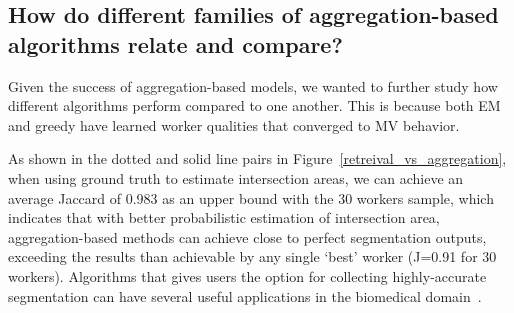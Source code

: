   \subsection{How do different families of aggregation-based algorithms relate and compare?}
  Given the success of aggregation-based models, we wanted to further study how different algorithms perform compared to one another.  This is because both EM and greedy have learned worker qualities that converged to MV behavior.
   \par As shown in the dotted and solid line pairs in Figure~\ref{retreival_vs_aggregation}, when using ground truth to estimate intersection areas, we can achieve an average Jaccard of 0.983 as an upper bound with the 30 workers sample, which indicates that with better probabilistic estimation of intersection area, aggregation-based methods can achieve close to perfect segmentation outputs, exceeding the results than achievable by any single `best' worker (J=0.91 for 30 workers). Algorithms that gives users the option for collecting highly-accurate segmentation can have several useful applications in the biomedical domain~\cite{Gurari2015}.
